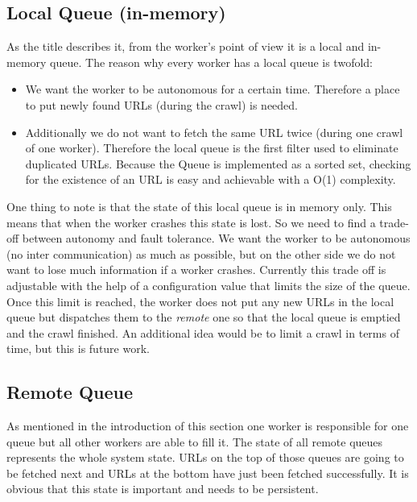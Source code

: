 \subsection{Local Queue (in-memory)}
\label{queues_local}
As the title describes it, from the worker's point of view it is a local and in-memory queue. The reason why every worker has a local queue is twofold:
\begin{itemize}
  \item We want the worker to be autonomous for a certain time. Therefore a place to put newly found URLs (during the crawl) is needed.
  \item Additionally we do not want to fetch the same URL twice (during one crawl of one worker). Therefore the local queue is the first filter used to eliminate duplicated URLs. Because the Queue is implemented as a sorted set, checking for the existence of an URL is easy and achievable with a O(1) complexity.
\end{itemize}

One thing to note is that the state of this local queue is in memory only. This means that when the worker crashes this state is lost. So we need to find a trade-off between autonomy and fault tolerance. We want the worker to be autonomous (no inter communication) as much as possible, but on the other side we do not want to lose much information if a worker crashes. Currently this trade off is adjustable with the help of a configuration value that limits the size of the queue. Once this limit is reached, the worker does not put any new URLs in the local queue but dispatches them to the \emph{remote} one so that the local queue is emptied and the crawl finished. An additional idea would be to limit a crawl in terms of time, but this is future work.

\subsection{Remote Queue}
\label{queues_remote}
As mentioned in the introduction of this section one worker is responsible for one queue but all other workers are able to fill it. The state of all remote queues represents the whole system state. URLs on the top of those queues are going to be fetched next and URLs at the bottom have just been fetched successfully. It is obvious that this state is important and needs to be persistent. 


